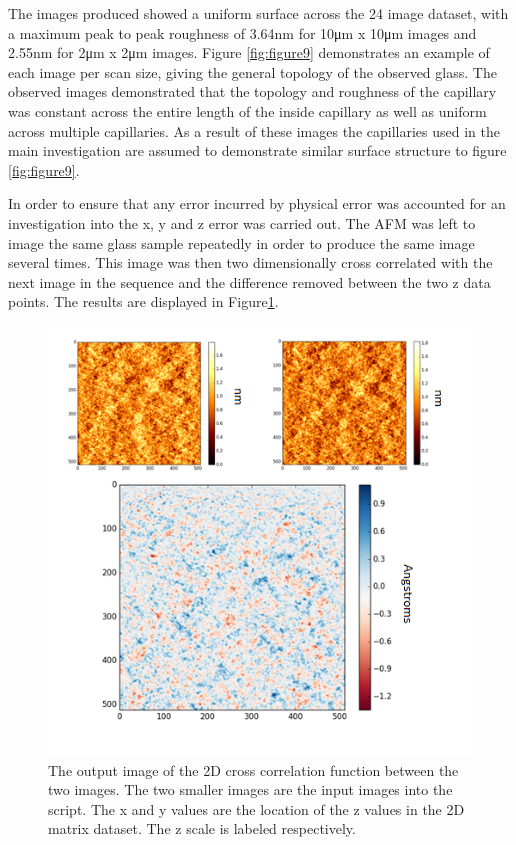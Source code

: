 The images produced showed a uniform surface across the 24 image dataset, with a maximum peak to peak roughness of 3.64nm for 10μm x 10μm images and 2.55nm for 2μm x 2μm images. Figure \ref{fig:figure9} demonstrates an example of each image per scan size, giving the general topology of the observed glass.
The observed images demonstrated that the topology and roughness of the capillary was constant across the entire length of the inside capillary as well as uniform across multiple capillaries. As a result of these images the capillaries used in the main investigation are assumed to demonstrate similar surface structure to figure \ref{fig:figure9}.

In order to ensure that any error incurred by physical error was accounted for an investigation into the x, y and z error was carried out. The AFM was left to image the same glass sample repeatedly in order to produce the same image several times. This image was then two dimensionally cross correlated with the next image in the sequence and the difference removed between the two z data points. The results are displayed in Figure\ref{fig:CrossCor}.

\begin{figure}[h]     %
        \begin{center}
          \includegraphics[width=120mm]{chapter3/CrossCor.png}
\end{center}
\caption{The output image of the 2D cross correlation function between the two images. The two smaller images are the input images into the script. The x and y values are the location of the z values in the 2D matrix dataset. The z scale is labeled respectively.}
\label{fig:CrossCor}                 %
\end{figure}

